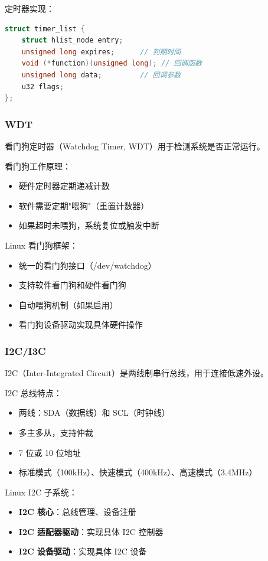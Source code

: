 定时器实现：
\begin{lstlisting}[language=C]
struct timer_list {
    struct hlist_node entry;
    unsigned long expires;      // 到期时间
    void (*function)(unsigned long); // 回调函数
    unsigned long data;         // 回调参数
    u32 flags;
};
\end{lstlisting}

\subsubsection{WDT}

看门狗定时器（Watchdog Timer, WDT）用于检测系统是否正常运行。

看门狗工作原理：
\begin{itemize}
  \item 硬件定时器定期递减计数
  \item 软件需要定期"喂狗"（重置计数器）
  \item 如果超时未喂狗，系统复位或触发中断
\end{itemize}

Linux 看门狗框架：
\begin{itemize}
  \item 统一的看门狗接口（/dev/watchdog）
  \item 支持软件看门狗和硬件看门狗
  \item 自动喂狗机制（如果启用）
  \item 看门狗设备驱动实现具体硬件操作
\end{itemize}

\subsubsection{I2C/I3C}

I2C（Inter-Integrated Circuit）是两线制串行总线，用于连接低速外设。

I2C 总线特点：
\begin{itemize}
  \item 两线：SDA（数据线）和 SCL（时钟线）
  \item 多主多从，支持仲裁
  \item 7 位或 10 位地址
  \item 标准模式（100kHz）、快速模式（400kHz）、高速模式（3.4MHz）
\end{itemize}

Linux I2C 子系统：
\begin{itemize}
  \item \textbf{I2C 核心}：总线管理、设备注册
  \item \textbf{I2C 适配器驱动}：实现具体 I2C 控制器
  \item \textbf{I2C 设备驱动}：实现具体 I2C 设备
\end{itemize}

